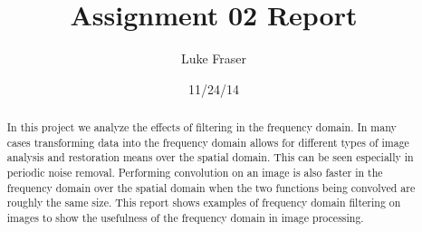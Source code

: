 \documentclass[letterpaper]{article}
\title{Assignment 02 Report}
\author{Luke Fraser}
\date{11/24/14}
\begin{document}
\maketitle
\begin{abstract}
In this project we analyze the effects of filtering in the frequency domain. In many cases transforming data into the frequency domain allows for different types of image analysis and restoration means over the spatial domain. This can be seen especially in periodic noise removal. Performing convolution on an image is also faster in the frequency domain over the spatial domain when the two functions being convolved are roughly the same size. This report shows examples of frequency domain filtering on images to show the usefulness of the frequency domain in image processing.
\end{abstract}
\end{document}
